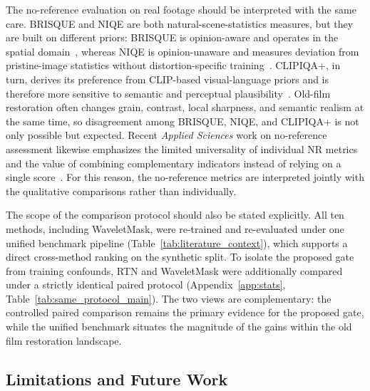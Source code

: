\documentclass[applsci,article,submit,pdftex,moreauthors]{Definitions/mdpi}
\begin{document}
The no-reference evaluation on real footage should be interpreted with the same care. BRISQUE and NIQE are both natural-scene-statistics measures, but they are built on different priors: BRISQUE is opinion-aware and operates in the spatial domain~\cite{mittal2012brisque}, whereas NIQE is opinion-unaware and measures deviation from pristine-image statistics without distortion-specific training~\cite{mittal2013niqe}. CLIPIQA+, in turn, derives its preference from CLIP-based visual-language priors and is therefore more sensitive to semantic and perceptual plausibility~\cite{wang2023clipiqa}. Old-film restoration often changes grain, contrast, local sharpness, and semantic realism at the same time, so disagreement among BRISQUE, NIQE, and CLIPIQA+ is not only possible but expected. Recent \textit{Applied Sciences} work on no-reference assessment likewise emphasizes the limited universality of individual NR metrics and the value of combining complementary indicators instead of relying on a single score~\cite{rubel2022combinednr}. For this reason, the no-reference metrics are interpreted jointly with the qualitative comparisons rather than individually.

The scope of the comparison protocol should also be stated explicitly. All ten methods, including WaveletMask, were re-trained and re-evaluated under one unified benchmark pipeline (Table~\ref{tab:literature_context}), which supports a direct cross-method ranking on the synthetic split. To isolate the proposed gate from training confounds, RTN and WaveletMask were additionally compared under a strictly identical paired protocol (Appendix~\ref{app:stats}, Table~\ref{tab:same_protocol_main}). The two views are complementary: the controlled paired comparison remains the primary evidence for the proposed gate, while the unified benchmark situates the magnitude of the gains within the old film restoration landscape.

\subsection{Limitations and Future Work}\label{subsec:limitations}
\end{document}
